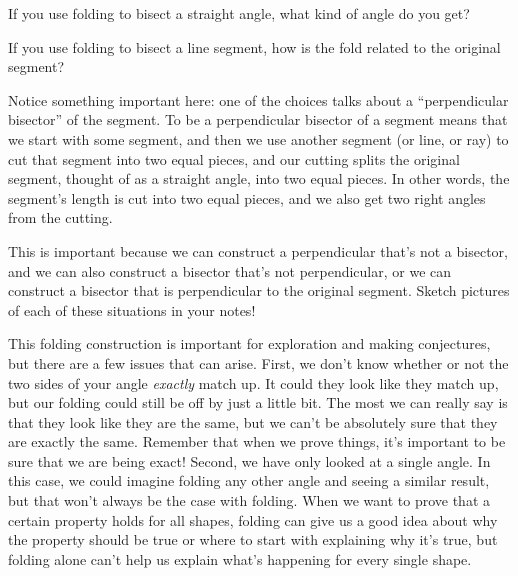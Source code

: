 \documentclass{ximera}
\begin{document}
\begin{question}
If you use folding to bisect a straight angle, what kind of angle do you get?
\begin{multipleChoice}
\end{multipleChoice}

If you use folding to bisect a line segment, how is the fold related to the original segment?
\begin{multipleChoice}
\end{multipleChoice} 
\begin{feedback}
	Notice something important here: one of the choices talks about a ``perpendicular bisector'' of the segment. To be a perpendicular bisector of a segment means that we start with some segment, and then we use another segment (or line, or ray) to cut that segment into two equal pieces, and our cutting splits the original segment, thought of as a straight angle, into two equal pieces. In other words, the segment's length is cut into two equal pieces, and we also get two right angles from the cutting.
	
	This is important because we can construct a perpendicular that's not a bisector, and we can also construct a bisector that's not perpendicular, or we can construct a bisector that is perpendicular to the original segment. Sketch pictures of each of these situations in your notes!
\end{feedback}
\end{question}

This folding construction is important for exploration and making conjectures, but there are a few issues that can arise. First, we don't know whether or not the two sides of your angle \emph{exactly} match up. It could they look like they match up, but our folding could still be off by just a little bit. The most we can really say is that they look like they are the same, but we can't be absolutely sure that they are exactly the same. Remember that when we prove things, it's important to be sure that we are being exact! Second, we have only looked at a single angle. In this case, we could imagine folding any other angle and seeing a similar result, but that won't always be the case with folding. When we want to prove that a certain property holds for all shapes, folding can give us a good idea about why the property should be true or where to start with explaining why it's true, but folding alone can't help us explain what's happening for every single shape. 
\end{document}
